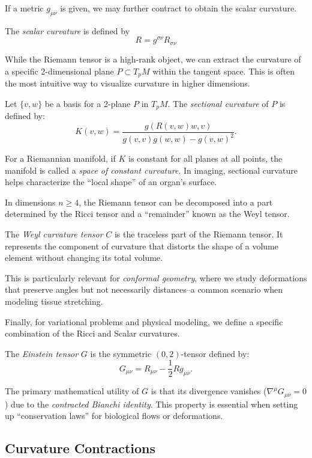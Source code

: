 If a metric $g_{\mu\nu}$ is given, we may further contract to obtain the scalar curvature.

\begin{definition}
  The \emph{scalar curvature} is defined by
  \[%
    R = g^{\sigma\nu} R_{\sigma\nu}
  \]%
\end{definition}

While the Riemann tensor is a high-rank object, we can extract the curvature of a specific 2-dimensional plane $P \subset T_pM$ within the tangent space. This is often the most intuitive way to visualize curvature in higher dimensions.
\begin{definition}
  Let $\{v, w\}$ be a basis for a 2-plane $P$ in $T_pM$. The \emph{sectional curvature} of $P$ is defined by:
  \[%
    K(v,w) = \frac{g(R(v,w)w, v)}{g(v,v)g(w,w) - g(v,w)^2}
  .\]%
\end{definition}
For a Riemannian manifold, if $K$ is constant for all planes at all points, the manifold is called a \emph{space of constant curvature}. In imaging, sectional curvature helps characterize the ``local shape'' of an organ's surface.

In dimensions $n \geq 4$, the Riemann tensor can be decomposed into a part determined by the Ricci tensor and a ``remainder'' known as the Weyl tensor.
\begin{definition}
  The \emph{Weyl curvature tensor} $C$ is the traceless part of the Riemann tensor. It represents the component of curvature that distorts the shape of a volume element without changing its total volume.
\end{definition}
This is particularly relevant for \emph{conformal geometry}, where we study deformations that preserve angles but not necessarily distances--a common scenario when modeling tissue stretching.

Finally, for variational problems and physical modeling, we define a specific combination of the Ricci and Scalar curvatures.
\begin{definition}
  The \emph{Einstein tensor} $G$ is the symmetric $(0,2)$-tensor defined by:
  \[%
    G_{\mu\nu} = R_{\mu\nu} - \frac{1}{2} R g_{\mu\nu}
  .\]%
\end{definition}
The primary mathematical utility of $G$ is that its divergence vanishes ($\nabla^\mu G_{\mu\nu} = 0$) due to the \emph{contracted Bianchi identity}. This property is essential when setting up ``conservation laws'' for biological flows or deformations.

\subsection{Curvature Contractions}

